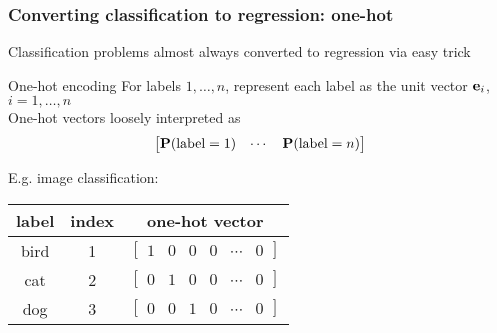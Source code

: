 \begin{frame}
    \frametitle{Converting classification to regression: one-hot}

    Classification problems almost always converted to regression via easy trick

    \begin{block}{One-hot encoding}
        For labels $1, \dots, n$, represent each label as the unit vector $\e_i$, $i = 1, \dots, n$ \\[1ex]
        One-hot vectors loosely interpreted as
        \begin{equation*}
            \begin{bmatrix}
                \P(\text{label} = 1) & \cdots & \P(\text{label} = n)
            \end{bmatrix}
        \end{equation*}
    \end{block}

    E.g. image classification: \\[0.5ex]

    \centering
    \begin{tabular}{c|cc}
        label & index & one-hot vector \\
        \hline
        bird & 1 & $\begin{bmatrix} 1 & 0 & 0 & 0 & \cdots & 0 \end{bmatrix}$ \\
        cat & 2 & $\begin{bmatrix} 0 & 1 & 0 & 0 & \cdots & 0 \end{bmatrix}$ \\
        dog & 3 & $\begin{bmatrix} 0 & 0 & 1 & 0 & \cdots & 0 \end{bmatrix}$ \\
    \end{tabular}
\end{frame}

